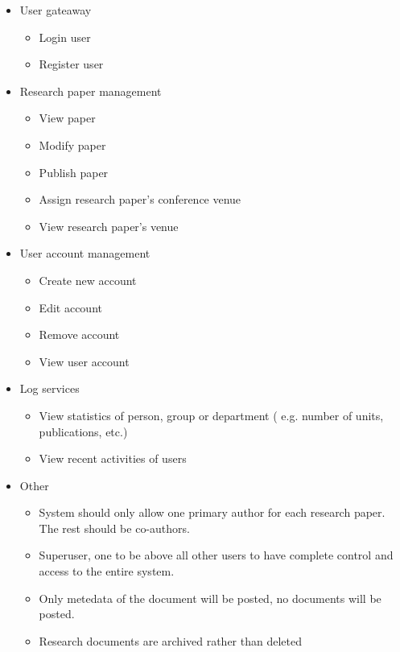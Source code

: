 \documentclass[11pt]{article}
\begin{document}
	\begin{itemize}
		\item User gateaway
		\begin{itemize}
			\item Login user
			\item Register user
		\end{itemize}
		\item Research paper management
		\begin{itemize}
			\item View paper
			\item Modify paper
			\item Publish paper
			\item Assign research paper's conference venue
			\item View research paper's venue
		\end{itemize}
		\item User account management
		\begin{itemize}
			\item Create new account
			\item Edit account
			\item Remove account
			\item View user account
		\end{itemize}
		\item Log services
		\begin{itemize}
			\item View statistics of person, group or department ( e.g. number of units, publications, etc.)
			\item View recent activities of users
		\end{itemize}
		\item Other
		\begin{itemize}
			\item System should only allow one primary author for each research paper. The rest should be co-authors.
			\item Superuser, one to be above all other users to have complete control and access to the entire system.
			\item Only metedata of the document will be posted, no documents will be posted.
			\item Research documents are archived rather than deleted
		\end{itemize}
		
	\end{itemize}
	
\end{document}
